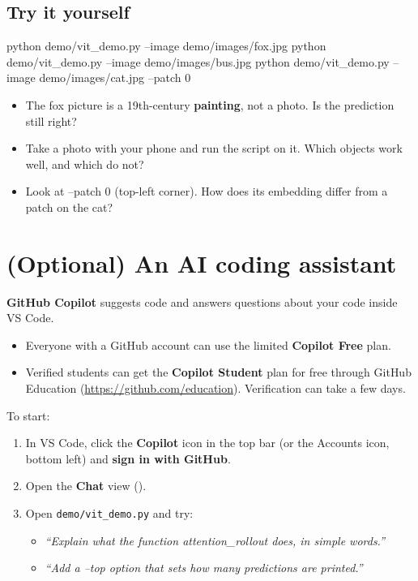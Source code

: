 \documentclass[11pt,a4paper]{article}
\newcommand{\key}[1]{\tcbox[on line, colback=tint, colframe=slate!60, boxrule=0.4pt, arc=0.8mm,
  left=0.8mm, right=0.8mm, top=0.2mm, bottom=0.2mm]{\small\ttfamily #1}}
\newcommand{\menu}[1]{\textsf{\textbf{#1}}}
\newcommand{\code}[1]{\colorbox{tint}{\ttfamily\small #1}}
\begin{document}
\subsection{Try it yourself}
\begin{cmd}
python demo/vit_demo.py --image demo/images/fox.jpg
python demo/vit_demo.py --image demo/images/bus.jpg
python demo/vit_demo.py --image demo/images/cat.jpg --patch 0
\end{cmd}
\begin{itemize}
  \item The fox picture is a 19th-century \textbf{painting}, not a photo. Is the prediction still right?
  \item Take a photo with your phone and run the script on it. Which objects work well, and which do not?
  \item Look at \code{--patch 0} (top-left corner). How does its embedding differ from a patch on the cat?
\end{itemize}

\newpage
\section{(Optional) An AI coding assistant}
\textbf{GitHub Copilot} suggests code and answers questions about your code inside VS Code.
\begin{itemize}
  \item Everyone with a GitHub account can use the limited \textbf{Copilot Free} plan.
  \item Verified students can get the \textbf{Copilot Student} plan for free through GitHub Education (\url{https://github.com/education}). Verification can take a few days.
\end{itemize}
To start:
\begin{enumerate}
  \item In VS Code, click the \menu{Copilot} icon in the top bar (or the Accounts icon, bottom left) and \textbf{sign in with GitHub}.
  \item Open the \menu{Chat} view (\key{Ctrl+Alt+I}).
  \item Open \texttt{demo/vit\_demo.py} and try:
  \begin{itemize}
    \item \emph{``Explain what the function attention\_rollout does, in simple words.''}
    \item \emph{``Add a --top option that sets how many predictions are printed.''}
  \end{itemize}
\end{enumerate}
\end{document}
